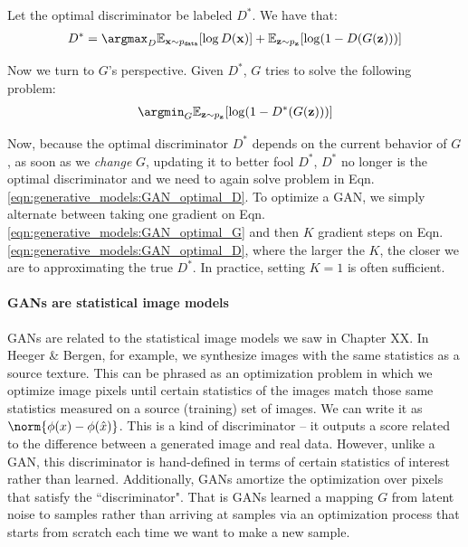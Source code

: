 Let the optimal discriminator be labeled $D^*$. We have that:
\begin{align}
    D^* = \argmax_D \mathbb{E}_{\mathbf{x} \sim p_{\texttt{data}}}[\log D(\mathbf{x})] + \mathbb{E}_{\mathbf{z} \sim p_{\mathbf{z}}}[\log (1-D(G(\mathbf{z})))] \label{eqn:generative_models:GAN_optimal_D}
\end{align}

Now we turn to $G$'s perspective. Given $D^*$, $G$ tries to solve the following problem:
\begin{align}
    \argmin_G \mathbb{E}_{\mathbf{z} \sim p_{\mathbf{z}}}[\log (1-D^*(G(\mathbf{z})))] \label{eqn:generative_models:GAN_optimal_G}
\end{align}

Now, because the optimal discriminator $D^*$ depends on the current behavior of $G$, as soon as we \textit{change} $G$, updating it to better fool $D^*$, $D^*$ no longer is the optimal discriminator and we need to again solve problem in Eqn. \ref{eqn:generative_models:GAN_optimal_D}. To optimize a GAN, we simply alternate between taking one gradient on Eqn. \ref{eqn:generative_models:GAN_optimal_G} and then $K$ gradient steps on Eqn. \ref{eqn:generative_models:GAN_optimal_D}, where the larger the $K$, the closer we are to approximating the true $D^*$. In practice, setting $K=1$ is often sufficient.

\paragraph{GANs are statistical image models}
GANs are related to the statistical image models we saw in Chapter XX. In Heeger \& Bergen, for example, we synthesize images with the same statistics as a source texture. This can be phrased as an optimization problem in which we optimize image pixels until certain statistics of the images match those same statistics measured on a source (training) set of images. We can write it as $\norm{\phi(x) - \phi(\hat{x})}$. This is a kind of discriminator -- it outputs a score related to the difference between a generated image and real data. However, unlike a GAN, this discriminator is hand-defined in terms of certain statistics of interest rather than learned. Additionally, GANs amortize the optimization over pixels that satisfy the ``discriminator". That is GANs learned a mapping $G$ from latent noise to samples rather than arriving at samples via an optimization process that starts from scratch each time we want to make a new sample.

